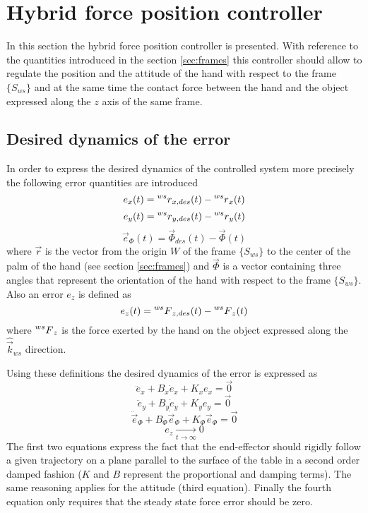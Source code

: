 \section{Hybrid force position controller}
In this section the hybrid force position controller is presented.
With reference to the quantities introduced in the section \ref{sec:frames}
this controller should allow to regulate the position and the attitude of the hand
with respect to the frame $\{S_{ws}\}$ and at the same time the contact force between
the hand and the object expressed along the $z$ axis of the same frame.

\subsection{Desired dynamics of the error}\label{sec:desired_dyn}
In order to express the desired dynamics of the controlled system
more precisely the following error quantities are introduced
\[
e_x(t) =   \prescript{ws}{} r_{x,des}(t) - \prescript{ws}{} r_{x}(t)
\]
\[
e_y(t) =   \prescript{ws}{} r_{y,des}(t) - \prescript{ws}{} r_{y}(t)
\]
\[
\vec{e}_{\Phi}(t) = \vec{\Phi}_{des}(t) - \vec{\Phi}(t)
\]
where $\vec{r}$ is the vector from the origin $W$ of the frame $\{S_{ws}\}$ to the
center of the palm of the hand (see section \ref{sec:frames}) and $\vec{\Phi}$ is
a vector containing three angles that represent the orientation of the hand with respect
to the frame $\{S_{ws}\}$.
Also an error $e_z$ is defined as
\[
e_{z}(t) = \prescript{ws}{} F_{z,des}(t) - \prescript{ws}{} F_{z}(t)
\]
where $\prescript{ws}{} F_{z}$ is the force exerted by the hand on the object expressed
along the $\hat{\vec{k}}_{ws}$ direction.
\par
Using these definitions the desired dynamics of the error is expressed as
\[
\ddot{e}_{x} + B_x \dot{e}_x + K_x e_x = \vec{0} %
\]
\[
\ddot{e}_{y} + B_y \dot{e}_y + K_y e_y = \vec{0} %
\]
\[
\ddot{\vec{e}}_{\Phi} + B_{\Phi} \dot{\vec{e}}_{\Phi} + K_{\Phi} \vec{e}_{\Phi} = \vec{0} %
\]
\[
e_z \xrightarrow[t \to \infty]{} 0
\]
The first two equations express the fact that the end-effector should rigidly follow
a given trajectory on a plane parallel to the surface of the table in a second order damped
fashion ($K$ and $B$ represent the proportional and damping terms).
The same reasoning applies for the attitude (third equation).
Finally the fourth equation only requires that the steady state force error should be zero.

